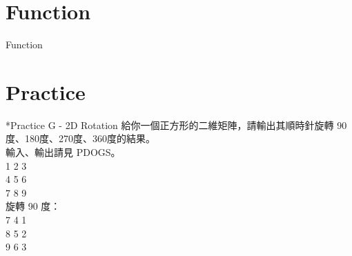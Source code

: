\documentclass[t]{beamer}
\begin{document}
\section{Function}
\begin{frame}{Function}
  
\end{frame}

\section{Practice}
\begin{frame}{*Practice G - 2D Rotation}
  給你一個正方形的二維矩陣，請輸出其順時針旋轉 90 度、180度、270度、360度的結果。\\
  輸入、輸出請見 PDOGS。\\
  1 2 3\\
  4 5 6\\
  7 8 9\\
  \vspace{1em}
  旋轉 90 度：\\
  7 4 1\\
  8 5 2\\
  9 6 3
\end{frame}
\end{document}
